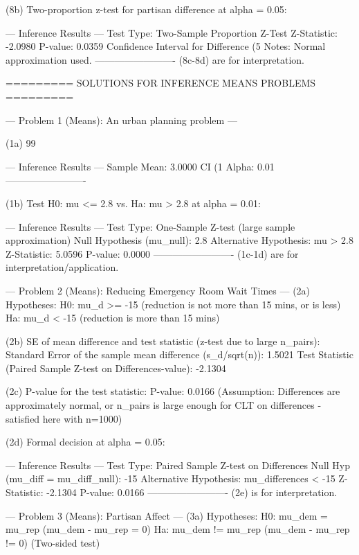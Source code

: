 (8b) Two-proportion z-test for partisan difference at alpha = 0.05:

--- Inference Results ---
  Test Type: Two-Sample Proportion Z-Test
  Z-Statistic: -2.0980
  P-value: 0.0359
  Confidence Interval for Difference (5%
  Notes: Normal approximation used.
-------------------------
(8c-8d) are for interpretation.


========= SOLUTIONS FOR INFERENCE MEANS PROBLEMS =========


--- Problem 1 (Means): An urban planning problem ---

(1a) 99%

--- Inference Results ---
  Sample Mean: 3.0000
  CI (1%
  Alpha: 0.01
-------------------------

(1b) Test H0: mu <= 2.8 vs. Ha: mu > 2.8 at alpha = 0.01:

--- Inference Results ---
  Test Type: One-Sample Z-test (large sample approximation)
  Null Hypothesis (mu_null): 2.8
  Alternative Hypothesis: mu > 2.8
  Z-Statistic: 5.0596
  P-value: 0.0000
-------------------------
(1c-1d) are for interpretation/application.


--- Problem 2 (Means): Reducing Emergency Room Wait Times ---
(2a) Hypotheses: H0: mu_d >= -15 (reduction is not more than 15 mins, or is less)
                 Ha: mu_d < -15 (reduction is more than 15 mins)

(2b) SE of mean difference and test statistic (z-test due to large n_pairs):
  Standard Error of the sample mean difference (s_d/sqrt(n)): 1.5021
  Test Statistic (Paired Sample Z-test on Differences-value): -2.1304

(2c) P-value for the test statistic:
  P-value: 0.0166
  (Assumption: Differences are approximately normal, or n_pairs is large enough for CLT on differences - satisfied here with n=1000)

(2d) Formal decision at alpha = 0.05:

--- Inference Results ---
  Test Type: Paired Sample Z-test on Differences
  Null Hyp (mu_diff = mu_diff_null): -15
  Alternative Hypothesis: mu_differences < -15
  Z-Statistic: -2.1304
  P-value: 0.0166
-------------------------
(2e) is for interpretation.


--- Problem 3 (Means): Partisan Affect ---
(3a) Hypotheses: H0: mu_dem = mu_rep (mu_dem - mu_rep = 0)
                 Ha: mu_dem != mu_rep (mu_dem - mu_rep != 0) (Two-sided test)

